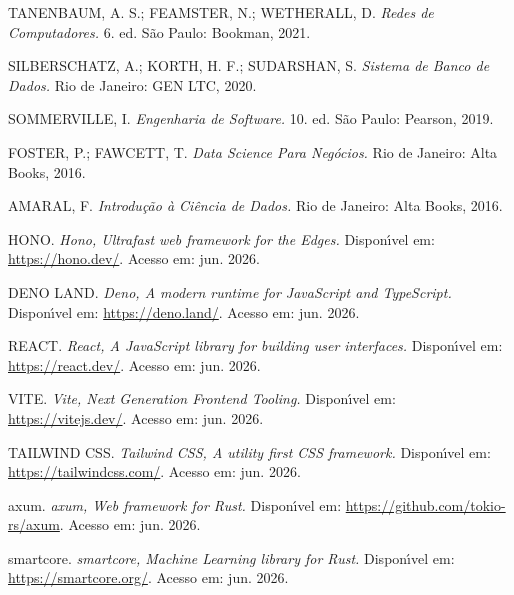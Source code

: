 \documentclass[12pt,a4paper]{article}
\begin{document}
\noindent TANENBAUM, A. S.; FEAMSTER, N.; WETHERALL, D. \textit{Redes de Computadores.} 6. ed. S\~ao Paulo: Bookman, 2021.

\noindent SILBERSCHATZ, A.; KORTH, H. F.; SUDARSHAN, S. \textit{Sistema de Banco de Dados.} Rio de Janeiro: GEN LTC, 2020.

\noindent SOMMERVILLE, I. \textit{Engenharia de Software.} 10. ed. S\~ao Paulo: Pearson, 2019.

\noindent FOSTER, P.; FAWCETT, T. \textit{Data Science Para Neg\'ocios.} Rio de Janeiro: Alta Books, 2016.

\noindent AMARAL, F. \textit{Introdu\c c\~ao \`a Ci\^encia de Dados.} Rio de Janeiro: Alta Books, 2016.

\noindent HONO. \textit{Hono, Ultrafast web framework for the Edges.} Dispon\'{\i}vel em: \url{https://hono.dev/}. Acesso em: jun. 2026.

\noindent DENO LAND. \textit{Deno, A modern runtime for JavaScript and TypeScript.} Dispon\'{\i}vel em: \url{https://deno.land/}. Acesso em: jun. 2026.

\noindent REACT. \textit{React, A JavaScript library for building user interfaces.} Dispon\'{\i}vel em: \url{https://react.dev/}. Acesso em: jun. 2026.

\noindent VITE. \textit{Vite, Next Generation Frontend Tooling.} Dispon\'{\i}vel em: \url{https://vitejs.dev/}. Acesso em: jun. 2026.

\noindent TAILWIND CSS. \textit{Tailwind CSS, A utility first CSS framework.} Dispon\'{\i}vel em: \url{https://tailwindcss.com/}. Acesso em: jun. 2026.

\noindent axum. \textit{axum, Web framework for Rust.} Dispon\'{\i}vel em: \url{https://github.com/tokio-rs/axum}. Acesso em: jun. 2026.

\noindent smartcore. \textit{smartcore, Machine Learning library for Rust.} Dispon\'{\i}vel em: \url{https://smartcore.org/}. Acesso em: jun. 2026.
\end{document}
